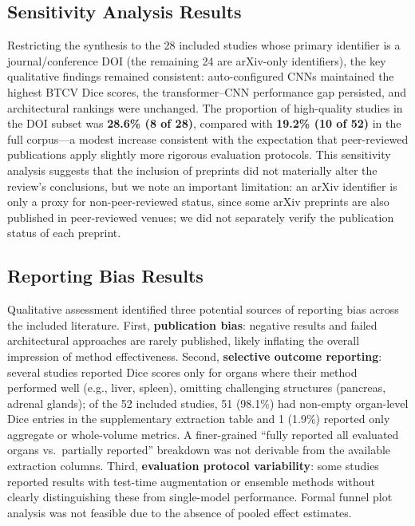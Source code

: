 \documentclass[conference]{IEEEtran}
\begin{document}
\subsection{Sensitivity Analysis Results}

Restricting the synthesis to the 28 included studies whose primary identifier is a journal/conference DOI (the remaining 24 are arXiv-only identifiers), the key qualitative findings remained consistent: auto-configured CNNs maintained the highest BTCV Dice scores, the transformer--CNN performance gap persisted, and architectural rankings were unchanged. The proportion of high-quality studies in the DOI subset was \textbf{28.6\% (8 of 28)}, compared with \textbf{19.2\% (10 of 52)} in the full corpus---a modest increase consistent with the expectation that peer-reviewed publications apply slightly more rigorous evaluation protocols. This sensitivity analysis suggests that the inclusion of preprints did not materially alter the review's conclusions, but we note an important limitation: an arXiv identifier is only a proxy for non-peer-reviewed status, since some arXiv preprints are also published in peer-reviewed venues; we did not separately verify the publication status of each preprint.

\subsection{Reporting Bias Results}

Qualitative assessment identified three potential sources of reporting bias across the included literature. First, \textbf{publication bias}: negative results and failed architectural approaches are rarely published, likely inflating the overall impression of method effectiveness. Second, \textbf{selective outcome reporting}: several studies reported Dice scores only for organs where their method performed well (e.g., liver, spleen), omitting challenging structures (pancreas, adrenal glands); of the 52 included studies, 51 (98.1\%) had non-empty organ-level Dice entries in the supplementary extraction table and 1 (1.9\%) reported only aggregate or whole-volume metrics. A finer-grained ``fully reported all evaluated organs vs.\ partially reported'' breakdown was not derivable from the available extraction columns. Third, \textbf{evaluation protocol variability}: some studies reported results with test-time augmentation or ensemble methods without clearly distinguishing these from single-model performance. Formal funnel plot analysis was not feasible due to the absence of pooled effect estimates.
\end{document}
